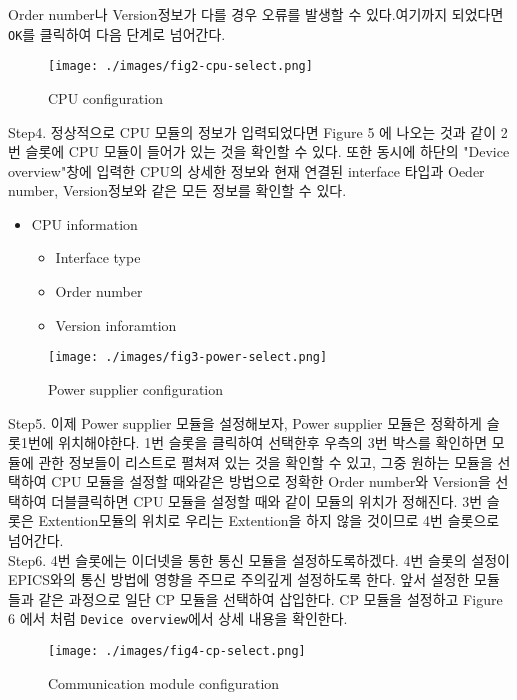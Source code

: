 \documentclass[11pt
  , a4paper
  , article
  , oneside
]{memoir}
\begin{document}
Order number나 Version정보가 다를 경우 오류를 발생할 수 있다.여기까지 되었다면 \verb|OK|를 클릭하여 다음 단계로 넘어간다.\\
\begin{figure}[!htb]
  \centering
  \texttt{[image: ./images/fig2-cpu-select.png]}
  \caption{CPU configuration}
  \label{}
\end{figure}
\newline Step4. 정상적으로 CPU 모듈의 정보가 입력되었다면 Figure 5 에 나오는 것과 같이 2번 슬롯에 CPU 모듈이 들어가 있는 것을 확인할 수 있다. 또한 동시에 하단의 "Device overview"창에 입력한 CPU의 상세한 정보와 현재 연결된 interface 타입과 Oeder number, Version정보와 같은 모든 정보를 확인할 수 있다.\\
\begin{itemize}
\item CPU information
\begin{itemize}
\item Interface type
\item Order number
\item Version inforamtion
\end{itemize}
\end{itemize}
\begin{figure}[!htb]
  \centering
  \texttt{[image: ./images/fig3-power-select.png]}
  \caption{Power supplier configuration}
  \label{}
\end{figure}
Step5. 이제 Power supplier 모듈을 설정해보자, Power supplier 모듈은 정확하게 슬롯1번에 위치해야한다. 1번 슬롯을 클릭하여 선택한후 우측의 3번 박스를 확인하면 모듈에 관한 정보들이 리스트로 펼쳐져 있는 것을 확인할 수 있고, 그중 원하는 모듈을 선택하여 CPU 모듈을 설정할 때와같은 방법으로 정확한 Order number와 Version을 선택하여 더블클릭하면 CPU 모듈을 설정할 때와 같이 모듈의 위치가 정해진다. 3번 슬롯은 Extention모듈의 위치로 우리는 Extention을 하지 않을 것이므로 4번 슬롯으로 넘어간다. \\
\newline Step6. 4번 슬롯에는 이더넷을 통한 통신 모듈을 설정하도록하겠다. 4번 슬롯의 설정이 EPICS와의 통신 방법에 영향을 주므로 주의깊게 설정하도록 한다. 앞서 설정한 모듈들과 같은 과정으로 일단 CP 모듈을 선택하여 삽입한다. CP 모듈을 설정하고 Figure 6 에서 처럼 \verb|Device overview|에서 상세 내용을 확인한다. \\
\begin{figure}[!htb]
  \centering
  \texttt{[image: ./images/fig4-cp-select.png]}
  \caption{Communication module configuration}
  \label{}
\end{figure}
\end{document}
